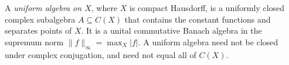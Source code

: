 
A \emph{uniform algebra on $X$}, where $X$ is compact Hausdorff, is a uniformly closed complex subalgebra $A\subseteq C(X)$ that contains the constant functions and separates points of $X$. It is a unital commutative Banach algebra in the supremum norm $\|f\|_\infty=\max_X|f|$. A uniform algebra need not be closed under complex conjugation, and need not equal all of $C(X)$.
